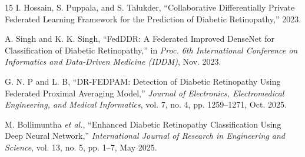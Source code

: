 \documentclass[12pt, a4paper]{article}
\begin{document}
\begin{thebibliography}{15}
I. Hossain, S. Puppala, and S. Talukder, ``Collaborative Differentially Private Federated Learning Framework for the Prediction of Diabetic Retinopathy,'' 2023.

A. Singh and K. K. Singh, ``FedDDR: A Federated Improved DenseNet for Classification of Diabetic Retinopathy,'' in \textit{Proc. 6th International Conference on Informatics and Data-Driven Medicine (IDDM)}, Nov. 2023.

G. N. P and L. B, ``DR-FEDPAM: Detection of Diabetic Retinopathy Using Federated Proximal Averaging Model,'' \textit{Journal of Electronics, Electromedical Engineering, and Medical Informatics}, vol. 7, no. 4, pp. 1259--1271, Oct. 2025.

M. Bollimuntha \textit{et al.}, ``Enhanced Diabetic Retinopathy Classification Using Deep Neural Network,'' \textit{International Journal of Research in Engineering and Science}, vol. 13, no. 5, pp. 1--7, May 2025.

\end{thebibliography}
\end{document}
